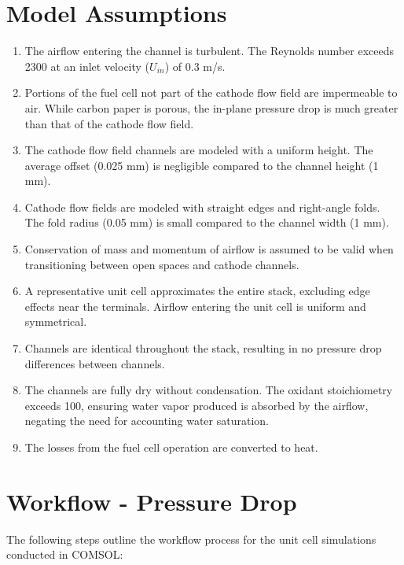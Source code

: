 \documentclass{report}
\begin{document}
    \section{Model Assumptions}
        \begin{enumerate}
            \item The airflow entering the channel is turbulent. The Reynolds number exceeds 2300 at an inlet velocity ($U_{in}$) of 0.3 m/s.
            \item Portions of the fuel cell not part of the cathode flow field are impermeable to air. While carbon paper is porous, the in-plane pressure drop is much greater than that of the cathode flow field.
            \item The cathode flow field channels are modeled with a uniform height. The average offset (0.025 mm) is negligible compared to the channel height (1 mm).
            \item Cathode flow fields are modeled with straight edges and right-angle folds. The fold radius (0.05 mm) is small compared to the channel width (1 mm).
            \item Conservation of mass and momentum of airflow is assumed to be valid when transitioning between open spaces and cathode channels.
            \item A representative unit cell approximates the entire stack, excluding edge effects near the terminals. Airflow entering the unit cell is uniform and symmetrical.
            \item Channels are identical throughout the stack, resulting in no pressure drop differences between channels.
            \item The channels are fully dry without condensation. The oxidant stoichiometry exceeds 100, ensuring water vapor produced is absorbed by the airflow, negating the need for accounting water saturation.
            \item The losses from the fuel cell operation are converted to heat. 
        \end{enumerate}

        \section{Workflow - Pressure Drop}
        The following steps outline the workflow process for the unit cell simulations conducted in COMSOL:
\end{document}
